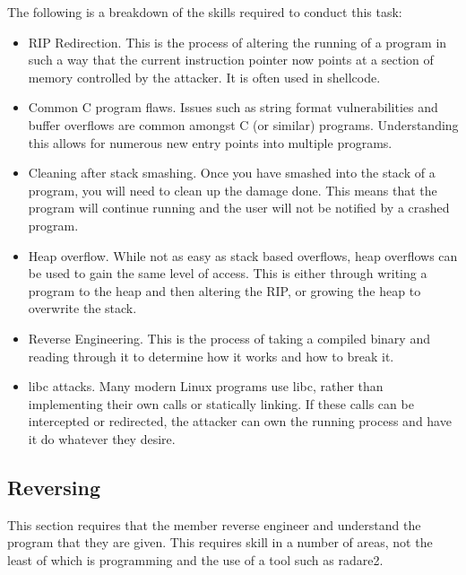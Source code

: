 \documentclass[a4paper,11pt]{report}
\begin{document}
			The following is a breakdown of the skills required to conduct this task:
			\begin{itemize}
				\item RIP Redirection. 
					This is the process of altering the running of a program in such a way that the current instruction pointer now points at a section of memory controlled by the attacker. 
					It is often used in shellcode. 
				\item Common C program flaws. 
					Issues such as string format vulnerabilities and buffer overflows are common amongst C (or similar) programs. 
					Understanding this allows for numerous new entry points into multiple programs. 
				\item Cleaning after stack smashing. 
					Once you have smashed into the stack of a program, you will need to clean up the damage done. 
					This means that the program will continue running and the user will not be notified by a crashed program. 
				\item Heap overflow. 
					While not as easy as stack based overflows, heap overflows can be used to gain the same level of access. 
					This is either through writing a program to the heap and then altering the RIP, or growing the heap to overwrite the stack. 
				\item Reverse Engineering.
					This is the process of taking a compiled binary and reading through it to determine how it works and how to break it. 
				\item libc attacks. 
					Many modern Linux programs use libc, rather than implementing their own calls or statically linking. 
					If these calls can be intercepted or redirected, the attacker can own the running process and have it do whatever they desire. 
			\end{itemize}
		\subsection{Reversing}
			This section requires that the member reverse engineer and understand the program that they are given. 
			This requires skill in a number of areas, not the least of which is programming and the use of a tool such as radare2. 
\end{document}
